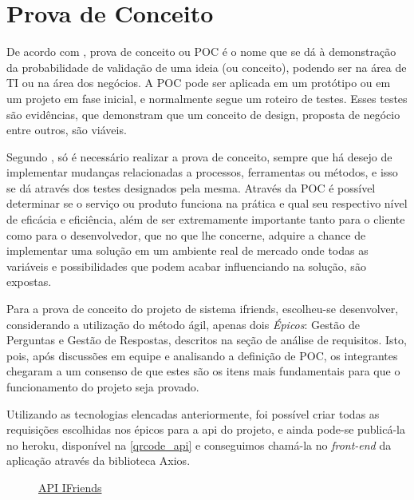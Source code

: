 \chapter{Prova de Conceito}

De acordo com , prova de conceito ou \acs{POC} é o nome que se dá à demonstração da probabilidade de validação de uma ideia (ou conceito), podendo ser na área de TI ou na área dos negócios. A \acs{POC} pode ser aplicada em um protótipo ou em um projeto em fase inicial, e normalmente segue um roteiro de testes. Esses testes são evidências, que demonstram que um conceito de design, proposta de negócio entre outros, são viáveis.

Segundo , só é necessário realizar a prova de conceito, sempre que há desejo de implementar mudanças relacionadas a processos, ferramentas ou métodos, e isso se dá através dos testes designados pela mesma. Através da \acs{POC} é possível determinar se o serviço ou produto funciona na prática e qual seu respectivo nível de eficácia e eficiência, além de ser extremamente importante tanto para o cliente como para o desenvolvedor, que no que lhe concerne, adquire a chance de implementar uma solução em um ambiente real de mercado onde todas as variáveis e possibilidades que podem acabar influenciando na solução, são expostas.

Para a prova de conceito do projeto de sistema \gls{ifriends}, escolheu-se desenvolver, considerando a utilização do método ágil, apenas dois \textit{Épicos}: Gestão de Perguntas e Gestão de Respostas, descritos na seção de análise de requisitos. Isto, pois, após discussões em equipe e analisando a definição de \acs{POC}, os integrantes chegaram a um consenso de que estes são os itens mais fundamentais para que o funcionamento do projeto seja provado. 

Utilizando as tecnologias elencadas anteriormente, foi possível criar todas as requisições escolhidas nos épicos para a \acs{api} do projeto, e ainda pode-se publicá-la no \gls{heroku}, disponível na \autoref{qrcode_api} e conseguimos chamá-la no \textit{front-end} da aplicação através da biblioteca Axios.

\begin{figure}[htb]
\centering
\caption{\href{https://ifriends-api.herokuapp.com/}{API IFriends}}

\label{qrcode_api}
\end{figure}
\FloatBarrier

